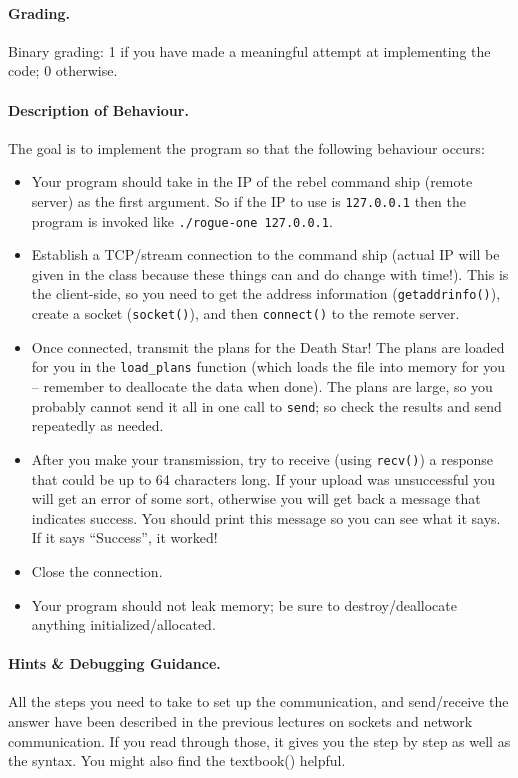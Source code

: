 \paragraph{Grading.} Binary grading: 1 if you have made a meaningful attempt at implementing the code; 0 otherwise.

\paragraph{Description of Behaviour.} The goal is to implement the program so that the following behaviour occurs:

\begin{itemize}
	\item Your program should take in the IP of the rebel command ship (remote server) as the first argument. So if the IP to use is \texttt{127.0.0.1} then the program is invoked like \texttt{./rogue-one 127.0.0.1}. 
	\item Establish a TCP/stream connection to the command ship (actual IP will be given in the class because these things can and do change with time!). This is the client-side, so you need to get the address information (\texttt{getaddrinfo()}), create a socket (\texttt{socket()}), and then \texttt{connect()} to the remote server. 
	\item Once connected, transmit the plans for the Death Star! The plans are loaded for you in the \texttt{load\_plans} function (which loads the file into memory for you -- remember to deallocate the data when done). The plans are large, so you probably cannot send it all in one call to \texttt{send}; so check the results and send repeatedly as needed.
	\item After you make your transmission, try to receive (using \texttt{recv()}) a response that could be up to 64 characters long. If your upload was unsuccessful you will get an error of some sort, otherwise you will get back a message that indicates success. You should print this message so you can see what it says. If it says ``Success'', it worked!
	\item Close the connection.
	\item Your program should not leak memory; be sure to destroy/deallocate anything initialized/allocated.
\end{itemize}


\paragraph{Hints \& Debugging Guidance.}
All the steps you need to take to set up the communication, and send/receive the answer have been described in the previous lectures on sockets and network communication. If you read through those, it gives you the step by step as well as the syntax. You might also find the textbook(\cite{apunix}) helpful.

